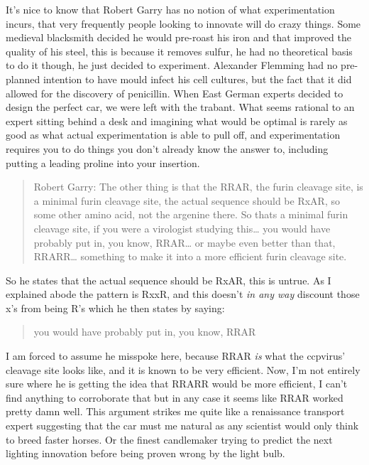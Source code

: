 \documentclass[11pt]{article}
\begin{document}
It's nice to know that Robert Garry has no notion of what experimentation incurs, that very frequently people looking to innovate will do crazy things. Some medieval blacksmith decided he would pre-roast his iron and that improved the quality of his steel, this is because it removes sulfur, he had no theoretical basis to do it though, he just decided to experiment. Alexander Flemming had no pre-planned intention to have mould infect his cell cultures, but the fact that it did allowed for the discovery of penicillin. When East German experts decided to design the perfect car, we were left with the trabant. What seems rational to an expert sitting behind a desk and imagining what would be optimal is rarely as good as what actual experimentation is able to pull off, and experimentation requires you to do things you don't already know the answer to, including putting a leading proline into your insertion.

\begin{quote}
Robert Garry: The other thing is that the RRAR, the furin cleavage site, is a minimal furin cleavage site, the actual sequence should be RxAR, so some other amino acid, not the argenine there. So thats a minimal furin cleavage site, if you were a virologist studying this\ldots{} you would have probably put in, you know, RRAR\ldots{} or maybe even better than that, RRARR\ldots{} something to make it into a more efficient furin cleavage site.
\end{quote}
So he states that the actual sequence should be RxAR, this is untrue. As I explained abode the pattern is RxxR, and this doesn't \emph{in any way} discount those x's from being R's which he then states by saying:
\begin{quote}
you would have probably put in, you know, RRAR
\end{quote}
I am forced to assume he misspoke here, because RRAR \emph{is} what the ccpvirus' cleavage site looks like, and it is known to be very efficient. Now, I'm not entirely sure where he is getting the idea that RRARR would be more efficient, I can't find anything to corroborate that but in any case it seems like RRAR worked pretty damn well. This argument strikes me quite like a renaissance transport expert suggesting that the car must me natural as any scientist would only think to breed faster horses. Or the finest candlemaker trying to predict the next lighting innovation before being proven wrong by the light bulb.
\end{document}
